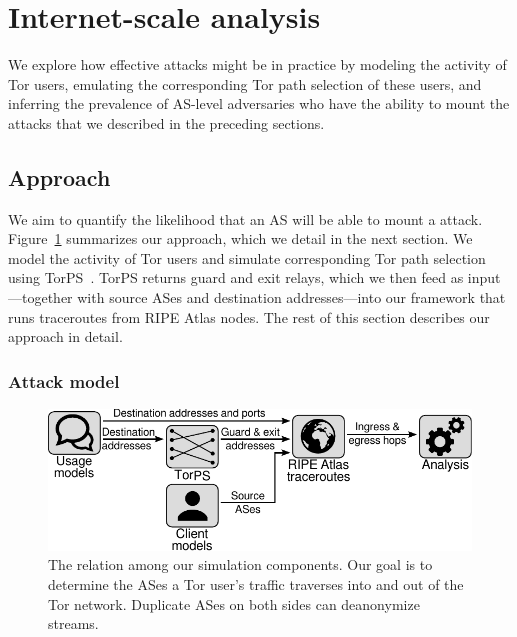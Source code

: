 \section{Internet-scale analysis}
\label{sec:internet-scale}

We explore how effective \name attacks might be in practice by modeling
the activity of Tor users, emulating the corresponding Tor path
selection of these users, and inferring the prevalence of AS-level
adversaries who have the ability to mount the attacks that we described
in the preceding sections.

\subsection{Approach}

We aim to quantify the likelihood that an AS will be able to mount a
\name attack.  Figure~\ref{fig:simulations} summarizes our approach,
which we detail in the next section. We model the activity of Tor users
and simulate corresponding Tor path selection using TorPS~\cite{TorPS}.
TorPS returns guard and exit relays, which we then feed as
input---together with source ASes and destination addresses---into our
framework that runs traceroutes from RIPE Atlas nodes.  The rest of this
section describes our approach in detail.

\subsubsection{Attack model}

\begin{figure}[t]
	\centering
	\includegraphics[width=\linewidth]{figures/simulations.pdf}
	\caption{The relation among our simulation components.  Our goal is to
	determine the ASes a Tor user's traffic traverses into and out of the Tor
	network.  Duplicate ASes on both sides can deanonymize streams.}
	\label{fig:simulations}
\end{figure}


